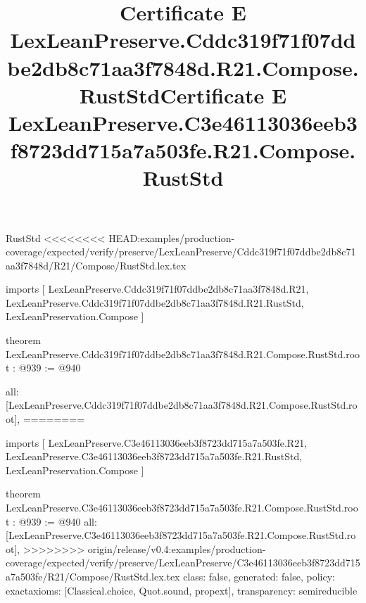 \begin{lexlean}{RustStd}
<<<<<<<< HEAD:examples/production-coverage/expected/verify/preserve/LexLeanPreserve/Cddc319f71f07ddbe2db8c71aa3f7848d/R21/Compose/RustStd.lex.tex
\title{Certificate E LexLeanPreserve.Cddc319f71f07ddbe2db8c71aa3f7848d.R21.Compose.RustStd}
\begin{coremodule}
imports [
  LexLeanPreserve.Cddc319f71f07ddbe2db8c71aa3f7848d.R21,
  LexLeanPreserve.Cddc319f71f07ddbe2db8c71aa3f7848d.R21.RustStd,
  LexLeanPreservation.Compose
]

theorem LexLeanPreserve.Cddc319f71f07ddbe2db8c71aa3f7848d.R21.Compose.RustStd.root : @939 := @940 {
  all: [LexLeanPreserve.Cddc319f71f07ddbe2db8c71aa3f7848d.R21.Compose.RustStd.root],
========
\title{Certificate E LexLeanPreserve.C3e46113036eeb3f8723dd715a7a503fe.R21.Compose.RustStd}
\begin{coremodule}
imports [
  LexLeanPreserve.C3e46113036eeb3f8723dd715a7a503fe.R21,
  LexLeanPreserve.C3e46113036eeb3f8723dd715a7a503fe.R21.RustStd,
  LexLeanPreservation.Compose
]

theorem LexLeanPreserve.C3e46113036eeb3f8723dd715a7a503fe.R21.Compose.RustStd.root : @939 := @940 {
  all: [LexLeanPreserve.C3e46113036eeb3f8723dd715a7a503fe.R21.Compose.RustStd.root],
>>>>>>>> origin/release/v0.4:examples/production-coverage/expected/verify/preserve/LexLeanPreserve/C3e46113036eeb3f8723dd715a7a503fe/R21/Compose/RustStd.lex.tex
  class: false,
  generated: false,
  policy: exact{axioms: [Classical.choice, Quot.sound, propext]},
  transparency: semireducible
}


\end{coremodule}}
\end{coremodule}
\end{lexlean}
